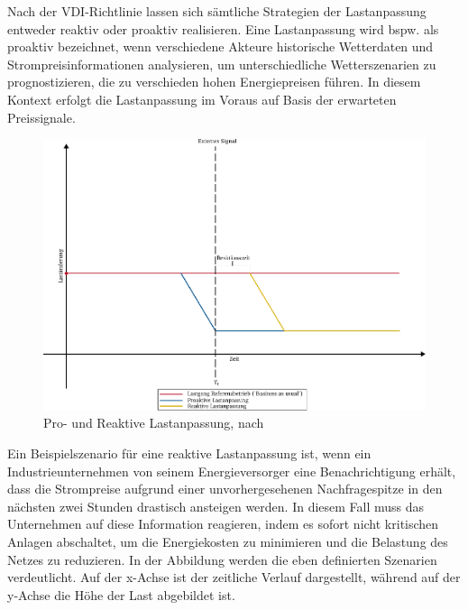 Nach der VDI-Richtlinie \cite{VDI5207Blatt2020} lassen sich sämtliche Strategien der Lastanpassung entweder reaktiv oder proaktiv realisieren. Eine Lastanpassung wird bspw. als proaktiv bezeichnet, wenn verschiedene Akteure historische Wetterdaten und Strompreisinformationen analysieren, um unterschiedliche Wetterszenarien zu prognostizieren, die zu verschieden hohen Energiepreisen führen. In diesem Kontext erfolgt die Lastanpassung im Voraus auf Basis der erwarteten Preissignale.\\

\begin{figure}[h]
	\centering
	\includegraphics[width=400pt]{figures/03_Grundlagen/Pro- und Reaktive Lastanpassung.pdf}
	\caption{Pro- und Reaktive Lastanpassung, nach \cite{VDI5207Blatt2020}}
	\label{fig_03Pro- und Reaktive Lastanpassung}
\end{figure}

Ein Beispielszenario für eine reaktive Lastanpassung ist, wenn ein Industrieunternehmen von seinem Energieversorger eine Benachrichtigung erhält, dass die Strompreise aufgrund einer unvorhergesehenen Nachfragespitze in den nächsten zwei Stunden drastisch ansteigen werden. In diesem Fall muss das Unternehmen auf diese Information reagieren, indem es sofort nicht kritischen Anlagen abschaltet, um die Energiekosten zu minimieren und die Belastung des Netzes zu reduzieren. In der Abbildung  werden die eben definierten Szenarien verdeutlicht. Auf der x-Achse ist der zeitliche Verlauf dargestellt, während auf der y-Achse die Höhe der Last abgebildet ist.\\

